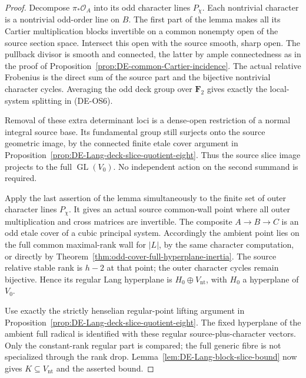 \begin{proof}
Decompose \(\pi_*\mathcal O_A\) into its odd character lines
\(P_\chi\). Each nontrivial character is a nontrivial odd-order
line on \(B\). The first part of the lemma makes all its Cartier
multiplication blocks invertible on a common nonempty open of the
source section space. Intersect this open with the source smooth,
sharp open. The pullback divisor is smooth and connected, the latter
by ample connectedness as in the proof of
Proposition~\ref{prop:DE-common-Cartier-incidence}. The actual
relative Frobenius is the direct sum of the source part and the
bijective nontrivial character cycles. Averaging the odd deck group
over \(\mathbf F_2\) gives exactly the local-system splitting
in (DE-OS6).

Removal of these extra determinant loci is a dense-open restriction
of a normal integral source base. Its fundamental group still
surjects onto the source geometric image, by the connected finite
etale cover argument in
Proposition~\ref{prop:DE-Lang-deck-slice-quotient-eight}.
Thus the source slice image projects to the full
\(\operatorname{GL}(V_0)\). No independent action on the second
summand is required.

Apply the last assertion of the lemma simultaneously to the finite
set of outer character lines \(P_\chi\). It gives an actual source
common-wall point where all outer multiplication and cross matrices
are invertible. The composite \(A\to B\to C\) is an odd etale
cover of a cubic principal system. Accordingly the ambient point
lies on the full common maximal-rank wall for \(|L|\), by the
same character computation, or directly by
Theorem~\ref{thm:odd-cover-full-hyperplane-inertia}.
The source relative stable rank is \(h-2\) at that point; the outer
character cycles remain bijective. Hence its regular Lang hyperplane
is \(H_0\oplus V_{\mathrm{nt}}\), with \(H_0\) a hyperplane of
\(V_0\).

Use exactly the strictly henselian regular-point lifting argument
in Proposition~\ref{prop:DE-Lang-deck-slice-quotient-eight}.
The fixed hyperplane of the ambient full radical is identified with
these regular source-plus-character vectors. Only the constant-rank
regular part is compared; the full generic fibre is not specialized
through the rank drop. Lemma~\ref{lem:DE-Lang-block-slice-bound}
now gives \(K\subseteq V_{\mathrm{nt}}\) and the asserted bound.
\end{proof}

